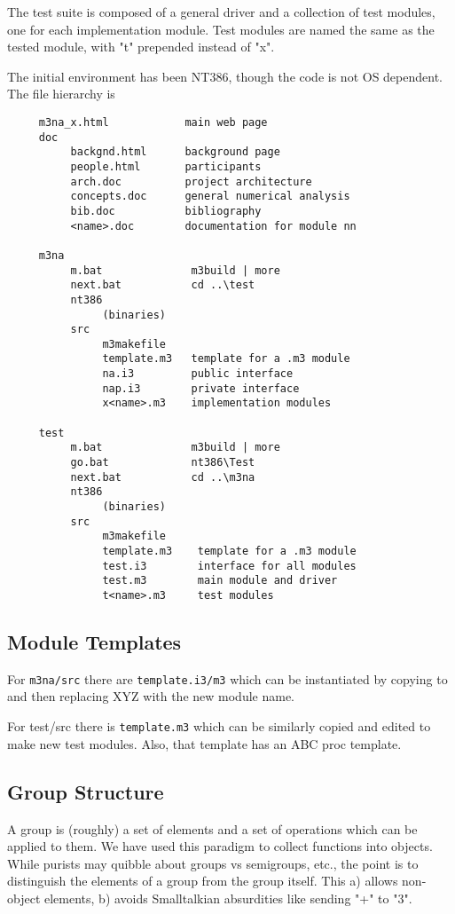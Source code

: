 The test suite is composed of a general driver and a
collection of test modules, one for each implementation
module.  Test modules are named the same as the tested
module, with "t" prepended instead of "x".

The initial environment has been NT386, though the code is
not OS dependent.  The file hierarchy is
\begin{verbatim}
     m3na_x.html            main web page
     doc
          backgnd.html      background page
          people.html       participants
          arch.doc          project architecture
          concepts.doc      general numerical analysis
          bib.doc           bibliography
          <name>.doc        documentation for module nn
          
     m3na
          m.bat              m3build | more
          next.bat           cd ..\test
          nt386
               (binaries)
          src
               m3makefile
               template.m3   template for a .m3 module
               na.i3         public interface
               nap.i3        private interface
               x<name>.m3    implementation modules
     
     test
          m.bat              m3build | more
          go.bat             nt386\Test
          next.bat           cd ..\m3na
          nt386
               (binaries)
          src
               m3makefile
               template.m3    template for a .m3 module
               test.i3        interface for all modules
               test.m3        main module and driver
               t<name>.m3     test modules
\end{verbatim}

\subsection{Module Templates}
For {\tt m3na/src} there are {\tt template.i3/m3} which can be instantiated
by copying to and then replacing XYZ with the new module name.

For test/src there is {\tt template.m3} which can be similarly copied and
edited to make new test modules.  Also, that template has an ABC proc
template.

\subsection{Group Structure}
A group is (roughly) a set of elements and a set of
operations which can be applied to them.  We have used this
paradigm to collect functions into objects.  While purists
may quibble about groups vs semigroups, etc., the point is
to distinguish the elements of a group from the group
itself.  This a) allows non-object elements, b) avoids
Smalltalkian absurdities like sending "+" to "3".

